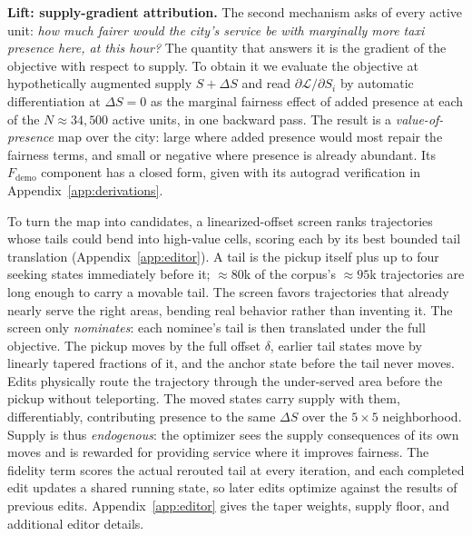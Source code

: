 \textbf{Lift: supply-gradient attribution.} The second mechanism asks of
every active unit: \emph{how much fairer would the city's service be with
marginally more taxi presence here, at this hour?} The quantity that answers
it is the gradient of the objective with respect to supply. To obtain it we
evaluate the objective at hypothetically augmented supply $S + \Delta S$ and
read $\partial \mathcal{L} / \partial S_i$ by automatic differentiation at
$\Delta S = 0$ as the marginal fairness effect of added presence at each of
the $N \approx 34{,}500$ active units, in one backward pass. The result is a
\emph{value-of-presence} map over the city: large where added presence would
most repair the fairness terms, and small or negative where presence is
already abundant. Its $F_{\mathrm{demo}}$ component has a closed form, given
with its autograd verification in Appendix~\ref{app:derivations}.

To turn the map into candidates, a linearized-offset screen ranks trajectories
whose tails could bend into high-value cells, scoring each by its best bounded
tail translation (Appendix~\ref{app:editor}). A tail is the pickup itself plus
up to four seeking states immediately before it; ${\approx}80$k of the
corpus's ${\approx}95$k trajectories are long enough to carry a movable tail.
The screen favors trajectories that already nearly serve the right areas,
bending real behavior rather than inventing it.
The screen only \emph{nominates}: each nominee's tail is then translated under
the full objective. The pickup moves by the full offset $\delta$, earlier tail
states move by linearly tapered fractions of it, and the anchor state before
the tail never moves. Edits physically route the trajectory 
through the under-served area before the pickup without teleporting. The moved
states carry supply with them, differentiably, contributing presence to
the same $\Delta S$ over the $5{\times}5$ neighborhood. Supply is thus
\emph{endogenous}: the optimizer sees the supply
consequences of its own moves and is rewarded for providing service where it
improves fairness. The fidelity term
scores the actual rerouted tail at every iteration, and each completed edit
updates a shared running state, so later edits optimize against the results of
previous edits. Appendix~\ref{app:editor} gives the taper weights,
supply floor, and additional editor details.

